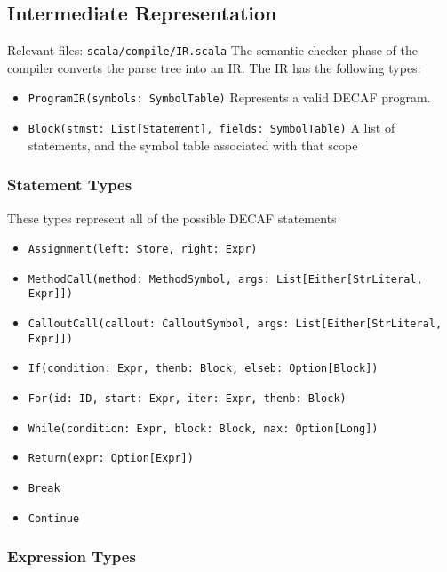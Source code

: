 \documentclass[11pt]{article}
\begin{document}
\subsection{Intermediate Representation}
\label{sec-2-3}

   Relevant files: \verb~scala/compile/IR.scala~
   The semantic checker phase of the compiler converts the parse tree into an IR.
   The IR has the following types:
\begin{itemize}
\item \verb~ProgramIR(symbols: SymbolTable)~ Represents a valid DECAF program.
\item \verb~Block(stmst: List[Statement], fields: SymbolTable)~ A list of statements, and the symbol table associated with that scope
\end{itemize}
\subsubsection{Statement Types}
\label{sec-2-3-1}

    These types represent all of the possible DECAF statements
\begin{itemize}
\item \verb~Assignment(left: Store, right: Expr)~
\item \verb~MethodCall(method: MethodSymbol, args: List[Either[StrLiteral, Expr]])~
\item \verb~CalloutCall(callout: CalloutSymbol, args: List[Either[StrLiteral, Expr]])~
\item \verb~If(condition: Expr, thenb: Block, elseb: Option[Block])~
\item \verb~For(id: ID, start: Expr, iter: Expr, thenb: Block)~
\item \verb~While(condition: Expr, block: Block, max: Option[Long])~
\item \verb~Return(expr: Option[Expr])~
\item \verb~Break~
\item \verb~Continue~
\end{itemize}
   
\subsubsection{Expression Types}
\label{sec-2-3-2}
\end{document}
